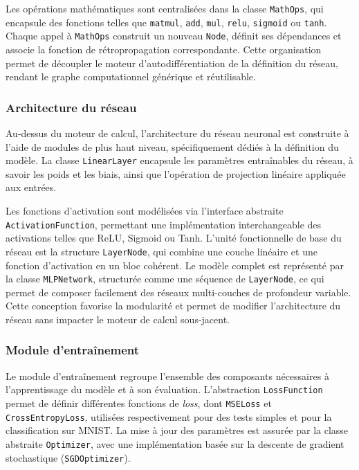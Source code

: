 \documentclass[a4paper,11pt]{article}
\begin{document}
Les opérations mathématiques sont centralisées dans la classe \texttt{MathOps}, qui encapsule des fonctions telles que \texttt{matmul}, \texttt{add}, \texttt{mul}, \texttt{relu}, \texttt{sigmoid} ou \texttt{tanh}. Chaque appel à \texttt{MathOps} construit un nouveau \texttt{Node}, définit ses dépendances et associe la fonction de rétropropagation correspondante. Cette organisation permet de découpler le moteur d'autodifférentiation de la définition du réseau, rendant le graphe computationnel générique et réutilisable.

\subsubsection{Architecture du réseau}
Au-dessus du moteur de calcul, l'architecture du réseau neuronal est construite à l'aide de modules de plus haut niveau, spécifiquement dédiés à la définition du modèle. La classe \texttt{LinearLayer} encapsule les paramètres entraînables du réseau, à savoir les poids et les biais, ainsi que l'opération de projection linéaire appliquée aux entrées.

Les fonctions d'activation sont modélisées via l'interface abstraite \texttt{ActivationFunction}, permettant une implémentation interchangeable des activations telles que ReLU, Sigmoid ou Tanh. L'unité fonctionnelle de base du réseau est la structure \texttt{LayerNode}, qui combine une couche linéaire et une fonction d'activation en un bloc cohérent. Le modèle complet est représenté par la classe \texttt{MLPNetwork}, structurée comme une séquence de \texttt{LayerNode}, ce qui permet de composer facilement des réseaux multi-couches de profondeur variable. Cette conception favorise la modularité et permet de modifier l'architecture du réseau sans impacter le moteur de calcul sous-jacent.

\subsubsection{Module d'entraînement}
Le module d'entraînement regroupe l'ensemble des composants nécessaires à l'apprentissage du modèle et à son évaluation. L'abstraction \texttt{LossFunction} permet de définir différentes fonctions de \textit{loss}, dont \texttt{MSELoss} et \texttt{CrossEntropyLoss}, utilisées respectivement pour des tests simples et pour la classification sur MNIST. La mise à jour des paramètres est assurée par la classe abstraite \texttt{Optimizer}, avec une implémentation basée sur la descente de gradient stochastique (\texttt{SGDOptimizer}).
\end{document}
